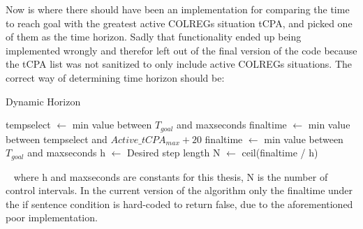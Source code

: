 Now is where there should have been an implementation for comparing the time to reach goal with the greatest active COLREGs situation tCPA, and picked
one of them as the time horizon. Sadly that functionality ended up being implemented wrongly and therefor left out of the final version of the code
because the tCPA list was not sanitized to only include active COLREGs situations. The correct way of determining time horizon should be:
\begin{algorithm}[h]
    \caption{Dynamic Horizon} \label{ALG: DynamicHorizon}
    \begin{algorithmic}
            \State \textrm{tempselect} $\gets$ \textrm{min value between $T_{goal}$ and maxseconds}
            \State \textrm{finaltime} $\gets$ \textrm{min value between tempselect and $Active\_tCPA_{max} + 20$}
        \Else
            \State \textrm{finaltime} $\gets$ \textrm{min value between $T_{goal}$ and maxseconds}
        \EndIf
        \State \textrm{h} $\gets$ \textrm{Desired step length}
        \State \textrm{N} $\gets$ \textrm{ceil(finaltime / h)}
    \end{algorithmic}
\end{algorithm}
 \newline
where h and maxseconds are constants for this thesis, N is the number of control intervals. In the current version of the algorithm only the finaltime under the if
sentence condition is hard-coded to return false, due to the aforementioned poor implementation.


